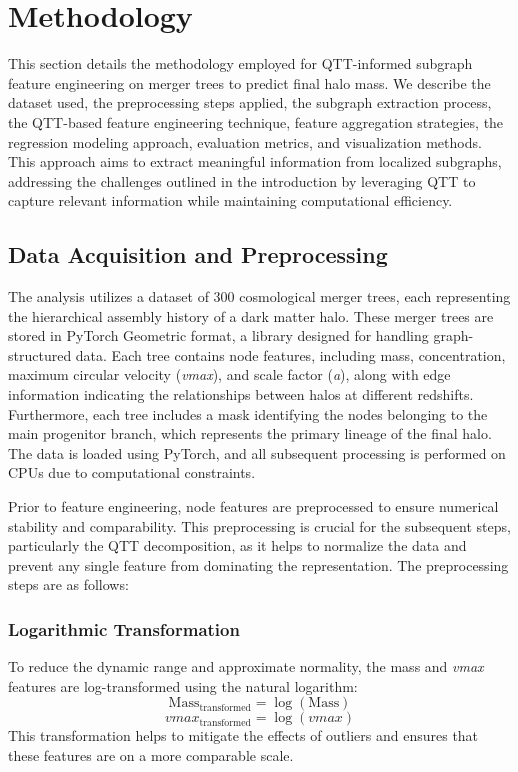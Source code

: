 \documentclass[twocolumn]{aastex631}
\begin{document}
\section{Methodology}

This section details the methodology employed for QTT-informed subgraph feature engineering on merger trees to predict final halo mass. We describe the dataset used, the preprocessing steps applied, the subgraph extraction process, the QTT-based feature engineering technique, feature aggregation strategies, the regression modeling approach, evaluation metrics, and visualization methods. This approach aims to extract meaningful information from localized subgraphs, addressing the challenges outlined in the introduction by leveraging QTT to capture relevant information while maintaining computational efficiency.

\subsection{Data Acquisition and Preprocessing}

The analysis utilizes a dataset of 300 cosmological merger trees, each representing the hierarchical assembly history of a dark matter halo. These merger trees are stored in PyTorch Geometric format, a library designed for handling graph-structured data. Each tree contains node features, including mass, concentration, maximum circular velocity (\textit{vmax}), and scale factor (\textit{a}), along with edge information indicating the relationships between halos at different redshifts. Furthermore, each tree includes a mask identifying the nodes belonging to the main progenitor branch, which represents the primary lineage of the final halo. The data is loaded using PyTorch, and all subsequent processing is performed on CPUs due to computational constraints.

Prior to feature engineering, node features are preprocessed to ensure numerical stability and comparability. This preprocessing is crucial for the subsequent steps, particularly the QTT decomposition, as it helps to normalize the data and prevent any single feature from dominating the representation. The preprocessing steps are as follows:

\subsubsection{Logarithmic Transformation}
To reduce the dynamic range and approximate normality, the mass and \textit{vmax} features are log-transformed using the natural logarithm:
\[
\text{Mass}_{\text{transformed}} = \log(\text{Mass})
\]
\[
\textit{vmax}_{\text{transformed}} = \log(\textit{vmax})
\]
This transformation helps to mitigate the effects of outliers and ensures that these features are on a more comparable scale.
\end{document}
